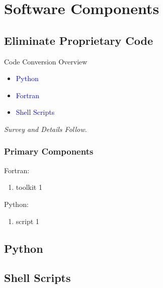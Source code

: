 % 
\renewcommand{\listingFontSize}{\tiny} 

\section{Software Components}

\subsection{Eliminate Proprietary Code}
\begin{frame}{Code Conversion Overview}
    \centering
    \textcolor{blue}{} \\[1em]
    \begin{itemize}
        \item \textcolor{blue}{Python} \\
        \item \textcolor{blue}{Fortran} \\
        \item \textcolor{blue}{Shell Scripts}
    \end{itemize}
    \vspace{1em}
    \textit{Survey and Details Follow.}
\end{frame}

\begin{frame}\frametitle{Primary Components}
Fortran:
\begin{enumerate}
	\item toolkit 1
\end{enumerate}
Python:
\begin{enumerate}
	\item script 1
\end{enumerate}
\end{frame}


\subsection{Python}
	
\subsection{Shell Scripts}

\endinput  %
